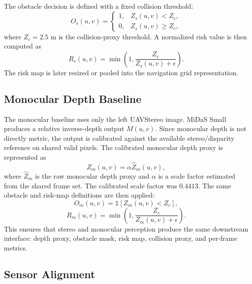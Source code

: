 \documentclass[12pt]{article}
\begin{document}
The obstacle decision is defined with a fixed collision threshold:
\begin{equation}
O_s(u,v)=
\begin{cases}
1, & Z_s(u,v) < Z_c,\\
0, & Z_s(u,v) \geq Z_c,
\end{cases}
\end{equation}
where $Z_c=2.5$ m is the collision-proxy threshold. A normalized risk value is then computed as
\begin{equation}
R_s(u,v)=\min\left(1,\frac{Z_c}{Z_s(u,v)+\epsilon}\right).
\end{equation}
The risk map is later resized or pooled into the navigation grid representation.

\subsection{Monocular Depth Baseline}

\noindent
The monocular baseline uses only the left UAVStereo image. MiDaS Small produces a relative inverse-depth output $M(u,v)$. Since monocular depth is not directly metric, the output is calibrated against the available stereo/disparity reference on shared valid pixels. The calibrated monocular depth proxy is represented as
\begin{equation}
Z_m(u,v)=\alpha \hat{Z}_m(u,v),
\end{equation}
where $\hat{Z}_m$ is the raw monocular depth proxy and $\alpha$ is a scale factor estimated from the shared frame set. The calibrated scale factor was $0.4413$. The same obstacle and risk-map definitions are then applied:
\begin{equation}
O_m(u,v)=\mathbb{1}[Z_m(u,v)<Z_c],
\end{equation}
\begin{equation}
R_m(u,v)=\min\left(1,\frac{Z_c}{Z_m(u,v)+\epsilon}\right).
\end{equation}
This ensures that stereo and monocular perception produce the same downstream interface: depth proxy, obstacle mask, risk map, collision proxy, and per-frame metrics.

\subsection{Sensor Alignment}
\end{document}
